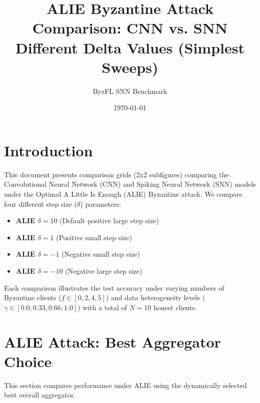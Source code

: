 \documentclass{article}
\title{ALIE Byzantine Attack Comparison: CNN vs. SNN\\Different Delta Values (Simplest Sweeps)}
\author{ByzFL SNN Benchmark}
\date{\today}
\begin{document}
\maketitle

\tableofcontents
\newpage

\section{Introduction}
This document presents comparison grids (2x2 subfigures) comparing the Convolutional Neural Network (CNN) and Spiking Neural Network (SNN) models under the Optimal A Little Is Enough (ALIE) Byzantine attack. We compare four different step size ($\delta$) parameters:
\begin{itemize}
    \item \textbf{ALIE $\delta=10$} (Default positive large step size)
    \item \textbf{ALIE $\delta=1$} (Positive small step size)
    \item \textbf{ALIE $\delta=-1$} (Negative small step size)
    \item \textbf{ALIE $\delta=-10$} (Negative large step size)
\end{itemize}

Each comparison illustrates the test accuracy under varying numbers of Byzantine clients ($f \in [0, 2, 4, 5]$) and data heterogeneity levels ($\gamma \in [0.0, 0.33, 0.66, 1.0]$) with a total of $N = 10$ honest clients.

\newpage

\section{ALIE Attack: Best Aggregator Choice}
This section compares performance under ALIE using the dynamically selected best overall aggregator.
\end{document}
